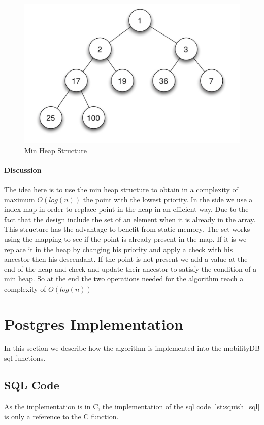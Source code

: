 \begin{figure}[!h]
\centering
\includegraphics[width=1\linewidth]{figures/tree.jpeg}
\caption{Min Heap Structure}
\label{fig:min_heap}
\end{figure}


\paragraph{Discussion}

The idea here is to use the min heap structure to obtain in a complexity of maximum $O(log(n))$  the point with the lowest priority. In the side we use a index map in order to replace point in the heap in an efficient way. Due to the fact that the design include the set of an element when it is already in the array. This structure has the advantage to benefit from static memory. The set works using the mapping to see if the point is already present in the map. If it is we replace it in the heap by changing his priority and apply a check with his ancestor then his descendant. If the point is not present we add a value at the end of the heap and check and update their ancestor to satisfy the condition of a min heap. So at the end the two operations needed for the algorithm reach a complexity of $O(log(n))$

\section{Postgres Implementation}

In this section we describe how the algorithm is implemented into the mobilityDB sql functions.
\subsection{SQL Code}
As the implementation is in C, the implementation of the sql code \ref{lst:squish_sql} is only a reference to the C function.


